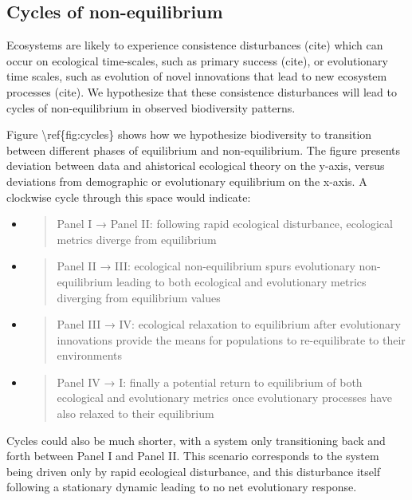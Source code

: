 \documentclass[]{article}
\begin{document}
\subsection{Cycles of non-equilibrium}\label{cycles-of-non-equilibrium}

Ecosystems are likely to experience consistence disturbances (cite)
which can occur on ecological time-scales, such as primary success
(cite), or evolutionary time scales, such as evolution of novel
innovations that lead to new ecosystem processes (cite). We hypothesize
that these consistence disturbances will lead to cycles of
non-equilibrium in observed biodiversity patterns.

Figure \textbackslash{}ref\{fig:cycles\} shows how we hypothesize
biodiversity to transition between different phases of equilibrium and
non-equilibrium. The figure presents deviation between data and
ahistorical ecological theory on the y-axis, versus deviations from
demographic or evolutionary equilibrium on the x-axis. A clockwise cycle
through this space would indicate:

\begin{itemize}
\item
  \begin{quote}
  Panel I → Panel II: following rapid ecological disturbance, ecological
  metrics diverge from equilibrium
  \end{quote}
\item
  \begin{quote}
  Panel II → III: ecological non-equilibrium spurs evolutionary
  non-equilibrium leading to both ecological and evolutionary metrics
  diverging from equilibrium values
  \end{quote}
\item
  \begin{quote}
  Panel III → IV: ecological relaxation to equilibrium after
  evolutionary innovations provide the means for populations to
  re-equilibrate to their environments
  \end{quote}
\item
  \begin{quote}
  Panel IV → I: finally a potential return to equilibrium of both
  ecological and evolutionary metrics once evolutionary processes have
  also relaxed to their equilibrium
  \end{quote}
\end{itemize}

Cycles could also be much shorter, with a system only transitioning back
and forth between Panel I and Panel II. This scenario corresponds to the
system being driven only by rapid ecological disturbance, and this
disturbance itself following a stationary dynamic leading to no net
evolutionary response.
\end{document}
